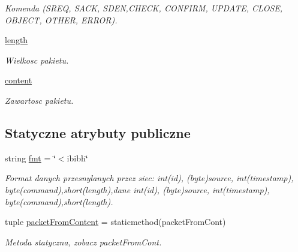 \begin{CompactItemize}
\begin{CompactList}\small\item\em Komenda (SREQ, SACK, SDEN,CHECK, CONFIRM, UPDATE, CLOSE, OBJECT, OTHER, ERROR). \item\end{CompactList}\item 
\hypertarget{class_serv_1_1_packet_1_1_packet_df68d3f40f5a7583fce563366f2f9e61}{
\hyperlink{class_serv_1_1_packet_1_1_packet_df68d3f40f5a7583fce563366f2f9e61}{length}}
\label{class_serv_1_1_packet_1_1_packet_df68d3f40f5a7583fce563366f2f9e61}

\begin{CompactList}\small\item\em Wielkosc pakietu. \item\end{CompactList}\item 
\hypertarget{class_serv_1_1_packet_1_1_packet_24efe22ef361ee7d966a663e96241820}{
\hyperlink{class_serv_1_1_packet_1_1_packet_24efe22ef361ee7d966a663e96241820}{content}}
\label{class_serv_1_1_packet_1_1_packet_24efe22ef361ee7d966a663e96241820}

\begin{CompactList}\small\item\em Zawartosc pakietu. \item\end{CompactList}\end{CompactItemize}
\subsection*{Statyczne atrybuty publiczne}
\begin{CompactItemize}
\item 
\hypertarget{class_serv_1_1_packet_1_1_packet_0406f36f89d9da4feb94f31959367ce8}{
string \hyperlink{class_serv_1_1_packet_1_1_packet_0406f36f89d9da4feb94f31959367ce8}{fmt} = \char`\"{}$<$ibibh\char`\"{}}
\label{class_serv_1_1_packet_1_1_packet_0406f36f89d9da4feb94f31959367ce8}

\begin{CompactList}\small\item\em Format danych przesnylanych przez siec: int(id), (byte)source, int(timestamp), byte(command),short(length),dane int(id), (byte)source, int(timestamp), byte(command),short(length). \item\end{CompactList}\item 
\hypertarget{class_serv_1_1_packet_1_1_packet_145ac89df7bc66728e8b3e642650aff4}{
tuple \hyperlink{class_serv_1_1_packet_1_1_packet_145ac89df7bc66728e8b3e642650aff4}{packetFromContent} = staticmethod(packetFromCont)}
\label{class_serv_1_1_packet_1_1_packet_145ac89df7bc66728e8b3e642650aff4}

\begin{CompactList}\small\item\em Metoda statyczna, zobacz packetFromCont. \item\end{CompactList}\end{CompactItemize}


